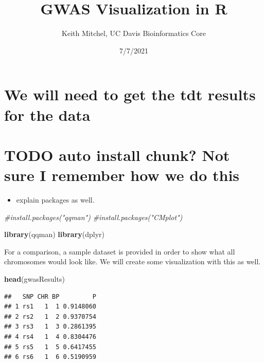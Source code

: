 \documentclass[
]{article}
\title{GWAS Visualization in R}
\author{Keith Mitchel, UC Davis Bioinformatics Core}
\date{7/7/2021}
\newenvironment{Shaded}{\begin{snugshade}}{\end{snugshade}}
\newcommand{\CommentTok}[1]{\textcolor[rgb]{0.56,0.35,0.01}{\textit{#1}}}
\newcommand{\KeywordTok}[1]{\textcolor[rgb]{0.13,0.29,0.53}{\textbf{#1}}}
\newcommand{\NormalTok}[1]{#1}
\providecommand{\tightlist}{%
  \setlength{\itemsep}{0pt}\setlength{\parskip}{0pt}}
\begin{document}
\maketitle

{
\setcounter{tocdepth}{2}
\tableofcontents
}
\hypertarget{we-will-need-to-get-the-tdt-results-for-the-data}{%
\section{We will need to get the tdt results for the
data}\label{we-will-need-to-get-the-tdt-results-for-the-data}}

\hypertarget{todo-auto-install-chunk-not-sure-i-remember-how-we-do-this}{%
\section{TODO auto install chunk? Not sure I remember how we do
this}\label{todo-auto-install-chunk-not-sure-i-remember-how-we-do-this}}

\begin{itemize}
\tightlist
\item
  explain packages as well.
\end{itemize}

\begin{Shaded}
\begin{Highlighting}[]
\CommentTok{#install.packages("qqman")}
\CommentTok{#install.packages("CMplot")}
\end{Highlighting}
\end{Shaded}

\begin{Shaded}
\begin{Highlighting}[]
\KeywordTok{library}\NormalTok{(qqman)}
\KeywordTok{library}\NormalTok{(dplyr)}
\end{Highlighting}
\end{Shaded}

For a comparison, a sample dataset is provided in order to show what all
chromosomes would look like. We will create some visualization with this
as well.

\begin{Shaded}
\begin{Highlighting}[]
\KeywordTok{head}\NormalTok{(gwasResults)}
\end{Highlighting}
\end{Shaded}

\begin{verbatim}
##   SNP CHR BP         P
## 1 rs1   1  1 0.9148060
## 2 rs2   1  2 0.9370754
## 3 rs3   1  3 0.2861395
## 4 rs4   1  4 0.8304476
## 5 rs5   1  5 0.6417455
## 6 rs6   1  6 0.5190959
\end{verbatim}
\end{document}
